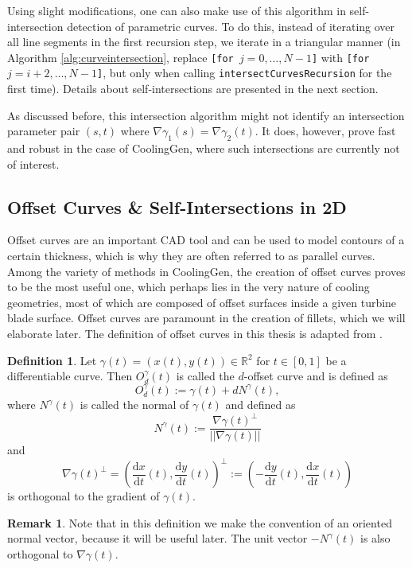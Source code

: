 \documentclass[a4paper, 11pt]{report}
\theoremstyle{definition}
\newtheorem{definition}{Definition}[section]
\newtheorem*{remark}{Remark}
\newcommand{\derivative}[2]{\frac{\textrm{d}{#1}}{\textrm{d}{#2}}}
\begin{document}
	Using slight modifications, one can also make use of this algorithm in self-intersection detection of parametric curves. To do this, instead of iterating over all line segments in the first recursion step, we iterate in a triangular manner (in Algorithm \ref{alg:curveintersection}, replace \texttt{[for $j = 0, \ldots, N-1$]} with \texttt{[for $j = i+2, \ldots, N-1$]}, but only when calling \texttt{intersectCurvesRecursion} for the first time). Details about self-intersections are presented in the next section.

	As discussed before, this intersection algorithm might not identify an intersection parameter pair $(s,t)$ where $\nabla \gamma_1(s) = \nabla \gamma_2(t)$. It does, however, prove fast and robust in the case of CoolingGen, where such intersections are currently not of interest.

\subsection{Offset Curves \& Self-Intersections in 2D}\label{sec:offsetcurves}
	Offset curves are an important CAD tool and can be used to model contours of a certain thickness, which is why they are often referred to as parallel curves. Among the variety of methods in CoolingGen, the creation of offset curves proves to be the most useful one, which perhaps lies in the very nature of cooling geometries, most of which are composed of offset surfaces inside a given turbine blade surface. Offset curves are paramount in the creation of fillets, which we will elaborate later. The definition of offset curves in this thesis is adapted from \cite{Elber1997}.

	\begin{definition}\label{def:offseteasy}
		Let $\gamma(t) = (x(t), y(t)) \in \mathbb{R}^2$ for $t\in[0,1]$ be a differentiable curve. Then $O^\gamma_d(t)$ is called the $d$-offset curve and is defined as
			$$ O^\gamma_d(t) := \gamma(t) + dN^\gamma(t),$$
		where $N^\gamma(t)$ is called the normal of $\gamma(t)$ and defined as
			$$N^\gamma(t) := \frac{\nabla\gamma(t)^\perp}{||\nabla\gamma(t)||}$$
		and
			$$\nabla\gamma(t)^\perp = \left(\derivative{x}{t}(t), \derivative{y}{t}(t)\right)^\perp := \left(-\derivative{y}{t}(t), \derivative{x}{t}(t)\right)$$
		is orthogonal to the gradient of $\gamma(t)$.
	\end{definition}

	\begin{remark}
		Note that in this definition we make the convention of an oriented normal vector, because it will be useful later. The unit vector $-N^\gamma(t)$ is also orthogonal to $\nabla \gamma(t)$.
	\end{remark}
\end{document}
